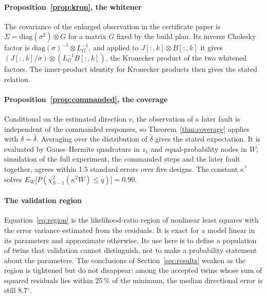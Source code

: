 \documentclass[preprint,12pt]{elsarticle}
\begin{document}
\paragraph{Proposition~\ref{prop:kron}, the whitener}
The covariance of the enlarged observation in the certificate paper is
$\Sigma = \mathrm{diag}(\sigma^2) \otimes G$ for a matrix $G$ fixed by the build
plan. Its inverse Cholesky factor is
$\mathrm{diag}(\sigma)^{-1} \otimes L_G^{-1}$, and applied to $J[:,k]\otimes
B[:,k]$ it gives $(J[:,k]/\sigma) \otimes (L_G^{-1}B[:,k])$, the Kronecker
product of the two whitened factors. The inner-product identity for Kronecker
products then gives the stated relation.

\paragraph{Proposition~\ref{prop:commanded}, the coverage}
Conditional on the estimated direction $v$, the observation of a later fault is
independent of the commanded responses, so Theorem~\ref{thm:coverage} applies
with $\delta = \hat\delta$. Averaging over the distribution of $\hat\delta$
gives the stated expectation. It is evaluated by Gauss--Hermite quadrature in
$z_1$ and equal-probability nodes in $W$; simulation of the full experiment, the
commanded steps and the later fault together, agrees within 1.5 standard errors
over five designs. The constant $\kappa^*$ solves
$E_W\bigl[P(\chi^2_{S-1}(\kappa^2 W)\le q)\bigr] = 0.90$.

\paragraph{The validation region}
Equation~\eqref{eq:region} is the likelihood-ratio region of nonlinear least
squares with the error variance estimated from the residuals. It is exact for a
model linear in its parameters and approximate otherwise. Its use here is to
define a population of twins that validation cannot distinguish, not to make a
probability statement about the parameters. The conclusions of
Section~\ref{sec:results} weaken as the region is tightened but do not
disappear: among the accepted twins whose sum of squared residuals lies within
25\,\% of the minimum, the median directional error is still 8.7$^\circ$.
\end{document}
